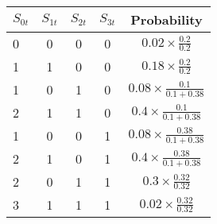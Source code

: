 \documentclass[12pt]{article}
\begin{document}
\vspace{4mm}

\begin{table}
    \begin{tabular}{lcccc}
        \hline
        $S_{0t}$ & $S_{1t}$ & $S_{2t}$ & $S_{3t}$ & Probability\\\hline
        0 & 0 & 0 & 0 & $0.02\times \frac{0.2}{0.2}$\\
        1 & 1 & 0 & 0 & $0.18\times \frac{0.2}{0.2}$ \\
        1 & 0 & 1 & 0 & $0.08\times \frac{0.1}{0.1 + 0.38}$ \\
        2 & 1 & 1 & 0 & $0.4\times \frac{0.1}{0.1 + 0.38}$\\
        1 & 0 & 0 & 1 & $0.08\times \frac{0.38}{0.1 + 0.38}$\\
        2 & 1 & 0 & 1 & $0.4\times \frac{0.38}{0.1 + 0.38}$ \\
        2 & 0 & 1 & 1 & $0.3\times \frac{0.32}{0.32}$ \\
        3 & 1 & 1 & 1 & $0.02\times \frac{0.32}{0.32}$\\\hline
    \end{tabular}
\end{table}
\end{document}
